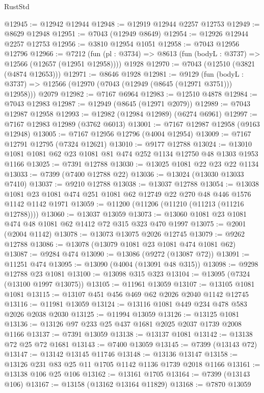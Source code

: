\begin{lexlean}{RustStd}
\begin{coremodule}
@12945 := @12942 @12944
@12948 := @12919 @12944 @2257 @12753
@12949 := @8629 @12948
@12951 := @7043 (@12949 @8649)
@12954 := @12926 @12944 @2257 @12753
@12956 := @3810 @12954 @1051
@12958 := @7043 @12956 @12796
@12966 := @7212
    (fun (pl : @3734) => @8613 (fun (bodyL : @3737) => @12566 (@12657 (@12951 @12958))))
    @1928
@12970 := @7043 (@12510 (@3821 (@4874 @12653)))
@12971 := @8646 @1928
@12981 := @9129
    (fun (bodyL : @3737) => @12566 (@12970 (@7043 (@12949 (@8645 (@12971 @3751))) @12958)))
    @2079
@12982 := @7167 @6964
@12983 := @12510 @4878
@12984 := @7043 @12983
@12987 := @12949 (@8645 (@12971 @2079))
@12989 := @7043 @12987 @12958
@12993 := @12982 (@12984 @12989) (@6274 @6961)
@12997 := @7167 @12983 @12989 (@3762 @6013)
@13001 := @7167 @12987 @12958 (@9163 @12948)
@13005 := @7167 @12956 @12796 (@4004 @12954)
@13009 := @7167 @12791 @12795 (@7324 @12621)
@13010 := @9177 @12788
@13024 := @13010 @1081 @1081 @62 @23 @1081 @81 @474 @252 @1134 @12750 @48 @1303 @1953 @1166
@13025 := @7391 @12788
@13030 := @13025 @1081 @22 @23 @22 @1134
@13033 := @7399 (@7400 @12788 @22)
@13036 := @13024 (@13030 @13033 @7410)
@13037 := @9210 @12788
@13038 := @13037 @12788
@13054 := @13038
    @1081
    @23
    @1081
    @474
    @251
    @1081
    @62
    @12749
    @22
    @270
    @48
    @446
    @1576
    @1142
    @1142
    @1971
@13059 := @11200 (@11206 (@11210 (@11213 (@11216 @12788))))
@13060 := @13037 @13059
@13073 := @13060 @1081 @23 @1081 @474 @48 @1081 @62 @1412 @72 @315 @323 @470 @1997
@13075 := @2001 (@2004 @1142)
@13078 := @13073 @13075 @2026 @12745
@13079 := @9262 @12788
@13086 := @13078 (@13079 @1081 @23 @1081 @474 @1081 @62)
@13087 := @9284 @474
@13090 := @13086 (@9272 (@13087 @72))
@13091 := @11251 @474
@13095 := @13090 (@4004 (@13091 @48 @315))
@13098 := @9298 @12788 @23 @1081
@13100 := @13098 @315 @323
@13104 := @13095 (@7324 (@13100 @1997 @13075))
@13105 := @11961 @13059
@13107 := @13105 @1081 @1081
@13115 := @13107 @451 @456 @469 @62 @2026 @2040 @1142 @12745
@13116 := @11981 @13059
@13124 := @13116 @1081 @449 @234 @478 @583 @2026 @2038 @2030
@13125 := @11994 @13059
@13126 := @13125 @1081
@13136 := @13126 @97 @233 @25 @437 @1681 @2025 @2037 @1739 @2008 @1166
@13137 := @7391 @13059
@13138 := @13137 @1081
@13142 := @13138 @72 @25 @72 @1681
@13143 := @7400 @13059
@13145 := @7399 (@13143 @72)
@13147 := @13142 @13145 @11746
@13148 := @13136 @13147
@13158 := @13126 @231 @83 @25 @11 @1705 @1142 @1136 @1739 @2018 @1166
@13161 := @13138 @106 @25 @106
@13162 := @13161 @1705
@13164 := @7399 (@13143 @106)
@13167 := @13158 (@13162 @13164 @11829)
@13168 := @7870 @13059

\end{coremodule}
\end{lexlean}
